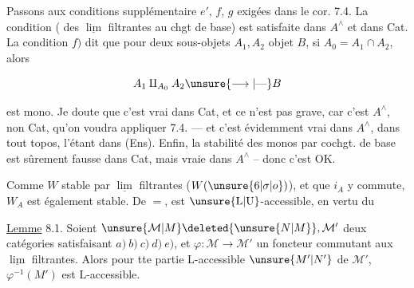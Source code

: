 
Passons aux conditions supplémentaire $e'$, $f$, $g$ exigées dans le cor. 7.4. La condition 
(  des $\underline{\lim}$ filtrantes au chgt de base) est satisfaite dans $A^\wedge$ et dans Cat. La
condition $f)$ dit que pour deux sous-objets $A_1,A_2$   objet $B$, si $A_0=A_1\cap A_2$,
alors

\[
 A_1\mathbin{\amalg}_{A_0}A_2\unsure{\longrightarrow|\text{---}}B
\]

est mono. Je doute que c'est vrai dans Cat, et ce n'est pas grave, car c'est  $A^\wedge$,
non  Cat, qu'on voudra appliquer 7.4. --- et c'est évidemment vrai dans $A^\wedge$,  
dans tout topos, l'étant dans (Ens). Enfin, la stabilité des monos par cochgt. de base
est sûrement fausse dans Cat, mais vraie dans $A^\wedge$ -- donc c'est OK.

Comme $W$ stable par $\underline{\lim}$ filtrantes
($W(\unsure{6|\sigma|o})$), et que $i_A$ y commute, $W_A$ est également stable. De $=$,  
 est $\unsure{\mathrm L|\mathrm U}$-accessible,  en vertu du

\uline{Lemme} 8.1. Soient $\unsure{\mathcal{M}|M}\deleted{\unsure{N|M}},\mathcal{M}'$ deux catégories satisfaisant $a)\ b)\ c)\ d)\ e)$, et $\varphi:\mathcal{M}\longrightarrow \mathcal{M}'$
un foncteur commutant aux $\underline{\lim}$ filtrantes. Alors pour tte partie $\mathrm L$-accessible $\unsure{M'|N'}$ de $\mathcal{M}'$, $\varphi^{-1}(M')$ est $\mathrm L$-accessible.
